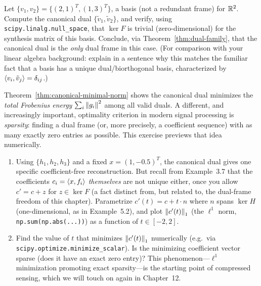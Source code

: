 \begin{exercisebox}[title={Lab Exercise 5.4: Dual Frames of a Basis Are Unique}]
Let $\{v_1, v_2\} = \{(2,1)^T, (1,3)^T\}$, a basis (not a redundant
frame) for $\mathbb{R}^2$. Compute the canonical dual $\{\tilde v_1, \tilde
v_2\}$, and verify, using \texttt{scipy.linalg.null\_space}, that
$\ker F$ is trivial (zero-dimensional) for the synthesis matrix of this
basis. Conclude, via Theorem~\ref{thm:dual-family}, that the canonical
dual is the \emph{only} dual frame in this case. (For comparison with
your linear algebra background: explain in a sentence why this matches
the familiar fact that a basis has a unique dual/biorthogonal basis,
characterized by $\left\langle v_i, \tilde v_j \right\rangle = \delta_{ij}$.)
\end{exercisebox}

\begin{exercisebox}[title={Lab Exercise 5.5 (Optional, Challenge): Sparsity-Promoting Duals}]
Theorem~\ref{thm:canonical-minimal-norm} shows the canonical dual
minimizes the \emph{total Frobenius energy} $\sum_i\left\| g_i \right\|^2$ among
all valid duals. A different, and increasingly important, optimality
criterion in modern signal processing is \emph{sparsity}: finding a dual
frame (or, more precisely, a coefficient sequence) with as many exactly
zero entries as possible. This exercise previews that idea numerically.
\begin{enumerate}[label=(\alph*)]
  \item Using $\{h_1,h_2,h_3\}$ and a fixed $x=(1,-0.5)^T$, the
        canonical dual gives one specific coefficient-free
        reconstruction. But recall from
        Example~3.7 that the coefficients $c_i=\left\langle x, f_i \right\rangle$
        \emph{themselves} are not unique either, once you allow
        $c'=c+z$ for $z\in\ker F$ (a fact distinct from, but related
        to, the dual-frame freedom of this chapter). Parametrize
        $c'(t) = c + t\cdot n$ where $n$ spans $\ker H$ (one-dimensional,
        as in Example~5.2), and plot $\left\| c'(t) \right\|_1$ (the $\ell^1$ norm,
        \texttt{np.sum(np.abs(...))}) as a function of $t\in[-2,2]$.
  \item Find the value of $t$ that minimizes $\left\| c'(t) \right\|_1$
        numerically (e.g.\ via \texttt{scipy.optimize.minimize\_scalar}).
        Is the minimizing coefficient vector sparse (does it have an
        exact zero entry)? This phenomenon---$\ell^1$ minimization
        promoting exact sparsity---is the starting point of compressed
        sensing, which we will touch on again in Chapter~12.
\end{enumerate}
\end{exercisebox}
\newpage
